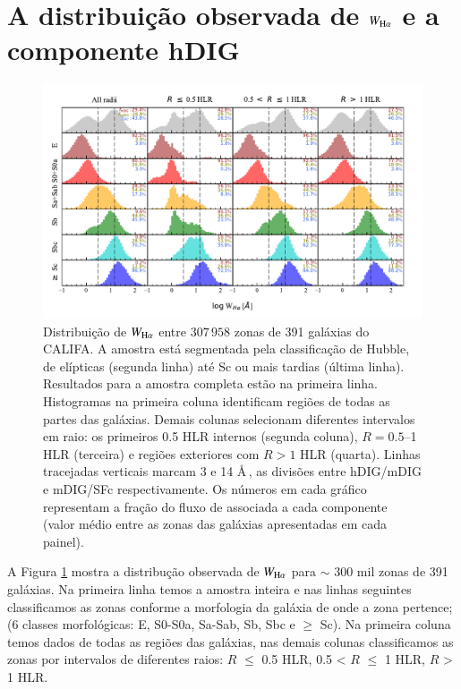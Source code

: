 \section{A distribuição observada de $W_{{\rm H}\alpha}$ e a componente hDIG}
\label{sec:DIGclass:WHaDistrib_hDIG}

\begin{figure}
\includegraphics[scale=0.9]{figuras/fig_WHa_histograms_per_morftype_and_radius_cumulFHa.pdf}
\caption[Histogramas de $W_{{\rm H}\alpha}$]
{Distribuição de $W_{\Ha}$ entre $307\,958$ zonas de 391 galáxias do CALIFA. A amostra está segmentada pela classificação de Hubble, de elípticas (segunda linha) até Sc ou mais tardias (última linha). Resultados para a amostra completa estão na primeira linha. Histogramas na primeira coluna identificam regiões de todas as partes das galáxias. Demais colunas selecionam diferentes intervalos em raio: os primeiros 0.5 HLR internos (segunda coluna), $R = 0.5$--1 HLR (terceira) e regiões exteriores com $R > 1$ HLR (quarta). Linhas tracejadas verticais marcam 3 e 14 \AA\,, as divisões entre hDIG/mDIG e mDIG/SFc respectivamente. Os números em cada gráfico representam a fração do fluxo de \Ha associada a cada componente (valor médio entre as zonas das galáxias apresentadas em cada painel).}
 \label{fig:WHaDistrib_ALLgals}
\end{figure}

A Figura \ref{fig:WHaDistrib_ALLgals} mostra a distribução observada de $W_{\Ha}$ para $\sim$ 300 mil zonas de 391 galáxias. Na primeira linha temos a amostra inteira e nas linhas seguintes classificamos as zonas conforme a morfologia da galáxia de onde a zona pertence; (6 classes morfológicas: E, S0-S0a, Sa-Sab, Sb, Sbc e $\ge$ Sc). Na primeira coluna temos dados de todas as regiões das galáxias, nas demais colunas classificamos as zonas por intervalos de diferentes raios: $R$ $\le$ 0.5 HLR, 0.5 < $R$ $\le$ 1 HLR, $R$ > 1 HLR.

